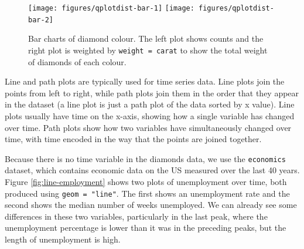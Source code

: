 \begin{figure}

{\centering \texttt{[image: figures/qplotdist-bar-1]} \texttt{[image: figures/qplotdist-bar-2]} 

}

\caption{Bar charts of diamond colour.  The left plot shows counts and the right plot is weighted by \texttt{weight = carat} to show the total weight of diamonds of each colour.\label{fig:dist-bar}}
\end{figure}


Line and path plots are typically used for time series data. Line plots
join the points from left to right, while path plots join them in the
order that they appear in the dataset (a line plot is just a path plot
of the data sorted by x value). Line plots usually have time on the
x-axis, showing how a single variable has changed over time. Path plots
show how two variables have simultaneously changed over time, with time
encoded in the way that the points are joined together.

Because there is no time variable in the diamonds data, we use the
\texttt{economics} dataset, which contains economic data on the US
measured over the last 40 years. Figure \ref{fig:line-employment} shows
two plots of unemployment over time, both produced using
\texttt{geom = "line"}. The first shows an unemployment rate and the
second shows the median number of weeks unemployed. We can already see
some differences in these two variables, particularly in the last peak,
where the unemployment percentage is lower than it was in the preceding
peaks, but the length of unemployment is high.
  

\begin{Shaded}
\begin{Highlighting}[]
\StringTok{ }  \NormalTok{)}
  \NormalTok{)}
\end{Highlighting}
\end{Shaded}

